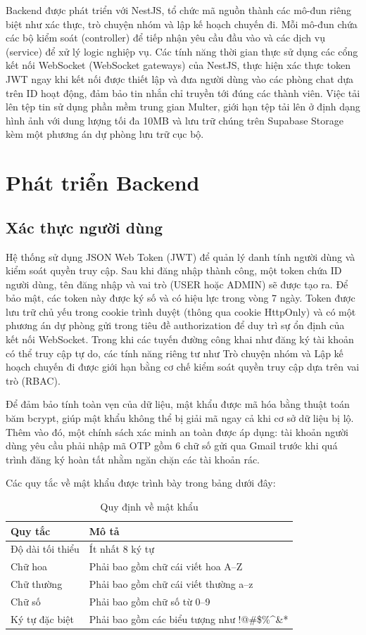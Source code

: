\documentclass[a4paper,12pt]{report}
\begin{document}
Backend được phát triển với NestJS, tổ chức mã nguồn thành các mô-đun riêng biệt như xác thực, trò chuyện nhóm và lập kế hoạch chuyến đi. Mỗi mô-đun chứa các bộ kiểm soát (controller) để tiếp nhận yêu cầu đầu vào và các dịch vụ (service) để xử lý logic nghiệp vụ. Các tính năng thời gian thực sử dụng các cổng kết nối WebSocket (WebSocket gateways) của NestJS, thực hiện xác thực token JWT ngay khi kết nối được thiết lập và đưa người dùng vào các phòng chat dựa trên ID hoạt động, đảm bảo tin nhắn chỉ truyền tới đúng các thành viên. Việc tải lên tệp tin sử dụng phần mềm trung gian Multer, giới hạn tệp tải lên ở định dạng hình ảnh với dung lượng tối đa 10MB và lưu trữ chúng trên Supabase Storage kèm một phương án dự phòng lưu trữ cục bộ.

\section{Phát triển Backend}
\subsection{Xác thực người dùng}

Hệ thống sử dụng JSON Web Token (JWT) để quản lý danh tính người dùng và kiểm soát quyền truy cập. Sau khi đăng nhập thành công, một token chứa ID người dùng, tên đăng nhập và vai trò (USER hoặc ADMIN) sẽ được tạo ra. Để bảo mật, các token này được ký số và có hiệu lực trong vòng 7 ngày. Token được lưu trữ chủ yếu trong cookie trình duyệt (thông qua cookie HttpOnly) và có một phương án dự phòng gửi trong tiêu đề authorization để duy trì sự ổn định của kết nối WebSocket. Trong khi các tuyến đường công khai như đăng ký tài khoản có thể truy cập tự do, các tính năng riêng tư như Trò chuyện nhóm và Lập kế hoạch chuyến đi được giới hạn bằng cơ chế kiểm soát quyền truy cập dựa trên vai trò (RBAC).

Để đảm bảo tính toàn vẹn của dữ liệu, mật khẩu được mã hóa bằng thuật toán băm bcrypt, giúp mật khẩu không thể bị giải mã ngay cả khi cơ sở dữ liệu bị lộ. Thêm vào đó, một chính sách xác minh an toàn được áp dụng: tài khoản người dùng yêu cầu phải nhập mã OTP gồm 6 chữ số gửi qua Gmail trước khi quá trình đăng ký hoàn tất nhằm ngăn chặn các tài khoản rác.

Các quy tắc về mật khẩu được trình bày trong bảng dưới đây:

\begin{table}[H]
\centering
\begin{tabular}{|p{4cm}|p{9cm}|}
\hline
\textbf{Quy tắc} & \textbf{Mô tả} \\
\hline
Độ dài tối thiểu & Ít nhất 8 ký tự \\
\hline
Chữ hoa & Phải bao gồm chữ cái viết hoa A--Z \\
\hline
Chữ thường & Phải bao gồm chữ cái viết thường a--z \\
\hline
Chữ số & Phải bao gồm chữ số từ 0--9 \\
\hline
Ký tự đặc biệt & Phải bao gồm các biểu tượng như !@\#\$\%\^{}\&* \\
\hline
\end{tabular}
\caption{Quy định về mật khẩu}
\label{tab:password_rules}
\end{table}
\end{document}
